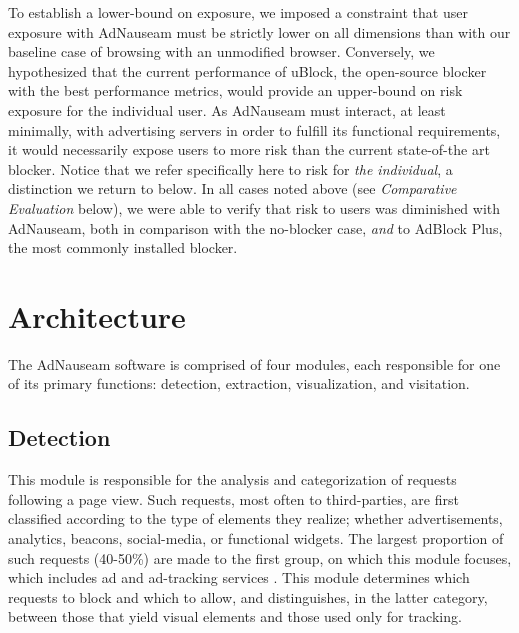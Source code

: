 \documentclass[conference]{IEEEtran}
\begin{document}
\noindent To establish a lower-bound on exposure, we imposed a constraint that user exposure with AdNauseam must be strictly lower on all dimensions than with our baseline case of browsing with an unmodified browser. Conversely, we hypothesized that the current performance of uBlock, the open-source blocker with the best performance metrics, would provide an upper-bound on risk exposure for the individual user. As AdNauseam must interact, at least minimally, with advertising servers in order to fulfill its functional requirements, it would necessarily expose users to more risk than the current state-of-the art blocker. Notice that we refer specifically here to risk for \emph{the individual}, a distinction we return to below. In all cases noted above (see \emph{Comparative Evaluation} below), we were able to verify that risk to users was diminished with AdNauseam, both in comparison with the no-blocker case, \emph{and} to AdBlock Plus, the most commonly installed blocker\cite{PageFair}.

\section{Architecture}

The AdNauseam software is comprised of four modules, each responsible for one of its primary functions: detection, extraction, visualization, and visitation.

\subsection{Detection}

This module is responsible for the analysis and categorization of requests following a page view. Such requests, most often to third-parties, are first classified according to the type of elements they realize; whether advertisements, analytics, beacons, social-media, or functional widgets. The largest proportion of such requests (40-50\%) are made to the first group, on which this module focuses, which includes ad and ad-tracking services \cite{Wills}. This module determines which requests to block and which to allow, and distinguishes, in the latter category, between those that yield visual elements and those used only for tracking.
\end{document}
